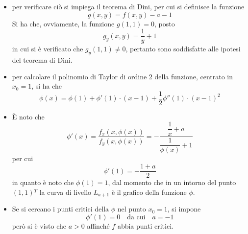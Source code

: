 \documentclass[a4paper]{extarticle}
\begin{document}
\begin{itemize}
    \item per verificare ciò si impiega il teorema di Dini, per cui si definisce la funzione
    \[g(x,y) = f(x,y)-a-1\]
    Si ha che, ovviamente, la funzione $g(1,1)=0$, posto
    \[g_y(x,y)=\dfrac{1}{y}+1\]
    in cui si è verificato che $g_y(1,1) \neq 0$, pertanto sono soddisfatte alle ipotesi del teorema di Dini.
    \item per calcolare il polinomio di Taylor di ordine $2$ della funzione, centrato in $x_0=1$, si ha che
    \[\phi(x) = \phi(1) + \phi'(1) \cdot (x-1) + \dfrac{1}{2} \phi''(1) \cdot (x-1)^2\]
    \item È noto che
    \[\phi'(x) = \dfrac{f_x(x,\phi(x))}{f_y(x,\phi(x))} = - \dfrac{\dfrac{1}{x}+a}{\dfrac{1}{\phi(x)}+1}\]
    per cui
    \[\phi'(1) = -\dfrac{1+a}{2}\]
    in quanto è noto che $\phi(1)=1$, dal momento che in un intorno del punto $(1,1){^T}$ la curva di livello $L_{a+1}$ è il grafico della funzione $\phi$.

    \item Se si cercano i punti critici della $\phi$ nel punto $x_0=1$, si impone
    \[\phi'(1)=0 \hspace{1em} \text{da cui} \hspace{1em} a=-1\]
    però si è visto che $a>0$ affinché $f$ abbia punti critici.
\end{itemize}
\end{document}
